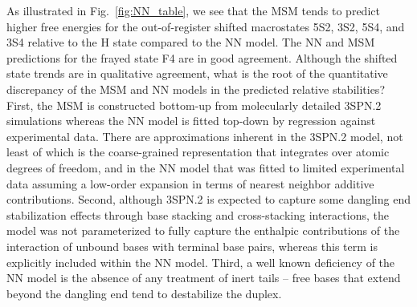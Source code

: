 \documentclass[journal=jpcbfk,manuscript=article]{achemso}
\begin{document}
As illustrated in Fig.~\ref{fig:NN_table}, we see that the MSM tends to predict higher free energies for the out-of-register shifted macrostates 5S2, 3S2, 5S4, and 3S4 relative to the H state compared to the NN model. The NN and MSM predictions for the frayed state F4 are in good agreement. Although the shifted state trends are in qualitative agreement, what is the root of the quantitative discrepancy of the MSM and NN models in the predicted relative stabilities? First, the MSM is constructed bottom-up from molecularly detailed 3SPN.2 simulations whereas the NN model is fitted top-down by regression against experimental data. There are approximations inherent in the 3SPN.2 model, not least of which is the coarse-grained representation that integrates over atomic degrees of freedom, and in the NN model that was fitted to limited experimental data assuming a low-order expansion in terms of nearest neighbor additive contributions. Second, although 3SPN.2 is expected to capture some dangling end stabilization effects through base stacking and cross-stacking interactions, the model was not parameterized to fully capture the enthalpic contributions of the interaction of unbound bases with terminal base pairs, whereas this term is explicitly included within the NN model. Third, a well known deficiency of the NN model is the absence of any treatment of inert tails -- free bases that extend beyond the dangling end tend to destabilize the duplex.\citep{DiMichele2014EffectHybridization}
\end{document}
